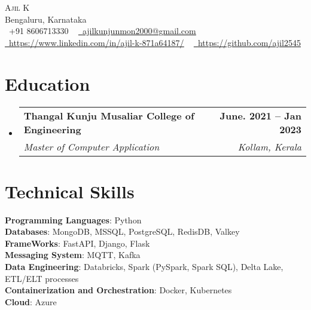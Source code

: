 \documentclass[letterpaper,11pt]{article}
\makeatletter
\newcommand{\resumeSubheading}[4]{
  \vspace{-2pt}\item
    \begin{tabular*}{1.0\textwidth}[t]{l@{\extracolsep{\fill}}r}
      \textbf{#1} & \textbf{\small #2} \\
      \textit{\small#3} & \textit{\small #4} \\
    \end{tabular*}\vspace{-7pt}
}
\newcommand{\resumeSubHeadingListStart}{\begin{itemize}[leftmargin=0.0in, label={}]}
\newcommand{\resumeSubHeadingListEnd}{\end{itemize}}
\makeatother
\begin{document}

\begin{center}
    {\Huge \scshape Ajil K} \\ \vspace{1pt}
    Bengaluru, Karnataka \\ \vspace{1pt}
    \small \raisebox{-0.1\height}\faPhone\ +91 8606713330 ~ \href{mailto:ajilkunjunmon2000@gmail.com}{\raisebox{-0.2\height}\faEnvelope\  \underline{ajilkunjunmon2000@gmail.com}} ~ 
    \href{https://www.linkedin.com/in/ajil-k-871a64187/}{\raisebox{-0.2\height}\faLinkedin\ \underline{https://www.linkedin.com/in/ajil-k-871a64187/}}  ~
    \href{https://github.com/ajil2545}{\raisebox{-0.2\height}\faGithub\ 
    \underline{https://github.com/ajil2545}}
    \vspace{-8pt}
\end{center}


\section{Education}
  \resumeSubHeadingListStart
    \resumeSubheading
      {Thangal Kunju Musaliar College of Engineering}{June. 2021 -- Jan 2023}
      {Master of Computer Application}{Kollam, Kerala}
  \resumeSubHeadingListEnd

\section{Technical Skills}
 \begin{itemize}[leftmargin=0.15in, label={}]
    \small{\item{
     \textbf{Programming Languages}{: Python} \\
     \textbf{Databases}{: MongoDB, MSSQL, PostgreSQL, RedisDB, Valkey} \\
     \textbf{FrameWorks}{: FastAPI, Django, Flask } \\
     \textbf{Messaging System}{: MQTT, Kafka} \\
     \textbf{Data Engineering}{: Databricks, Spark (PySpark, Spark SQL), Delta Lake, ETL/ELT processes}\\
      \textbf{Containerization and Orchestration}{: Docker, Kubernetes}\\
     \textbf{Cloud}{: Azure} \\
    
    }}
 \end{itemize}
 \vspace{-16pt}
\end{document}
